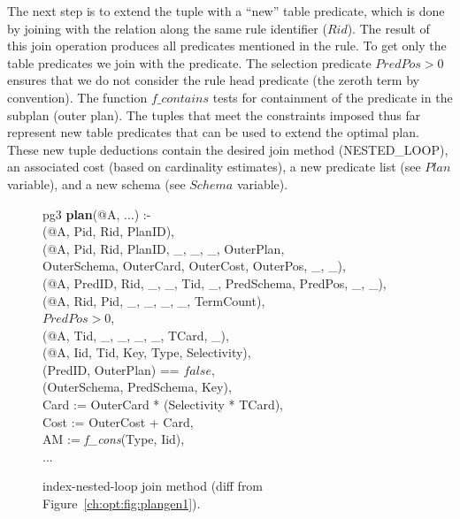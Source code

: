 The next step is to extend the  tuple with a ``new'' table predicate,
which is done by joining with the  relation along the same
rule identifier ($Rid$).  The result of this join operation produces all
predicates mentioned in the rule.  To get only the table predicates we join
with the  predicate.  The selection predicate $PredPos > 0$
ensures that we do not consider the rule head predicate (the zeroth term by
convention).  The function $f\_contains$ tests for containment of the predicate
in the subplan (outer plan).  The tuples that meet the constraints imposed thus
far represent new table predicates that can be used to extend the optimal plan.
These new  tuple deductions contain the desired join method
(NESTED\_LOOP), an associated cost (based on cardinality estimates), a new
predicate list (see $Plan$ variable), and a new schema (see $Schema$ variable).

\begin{figure*}
\ssp
\centering
\begin{boxedminipage}{\linewidth}
pg3 {\bf plan}(@A, ...) :-\\
(@A, Pid, Rid, PlanID),\\
(@A, Pid, Rid, PlanID, \_, \_, \_, OuterPlan, \\
\datalogspace \datalogspace OuterSchema, OuterCard, OuterCost, OuterPos, \_, \_),  \\   
(@A, PredID, Rid, \_, \_, Tid, \_, PredSchema, PredPos, \_, \_),\\
(@A, Rid, Pid, \_, \_, \_, \_, TermCount), \\
\datalogspace $PredPos > 0$,\\
(@A, Tid, \_, \_, \_, \_, TCard, \_),\\
(@A, Iid, Tid, Key, Type, Selectivity),\\
(PredID, OuterPlan) == $false$,\\
(OuterSchema, PredSchema, Key),\\
\datalogspace Card   := OuterCard * (Selectivity * TCard),\\
\datalogspace Cost   := OuterCost + Card,\\
\datalogspace AM := {\em f\_cons}(Type, Iid),\\
\datalogspace ...
\end{boxedminipage}
\caption{\label{ch:opt:fig:plangen2}index-nested-loop join method (diff from Figure~\ref{ch:opt:fig:plangen1}).}
\end{figure*}


